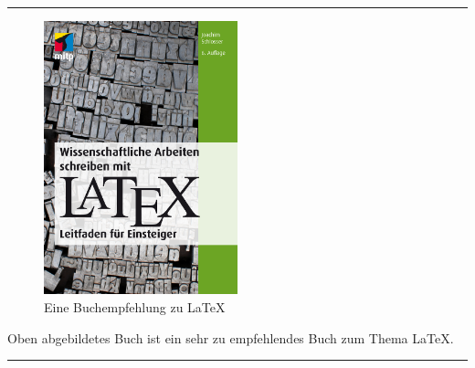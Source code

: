 \vspace{1em}
\hrule
\vspace{1em}

\begin{figure}[h!]
\centering
  \includegraphics[width=0.5\textwidth]{./bilder/LaTeX_Buch.jpg}
  \caption{Eine Buchempfehlung zu \LaTeX}
\end{figure}

\bigskip 

Oben abgebildetes Buch\cite{Schlosser2017} ist ein sehr zu empfehlendes Buch zum Thema \LaTeX. 

\vspace{1em}
\hrule
\vspace{1em}
